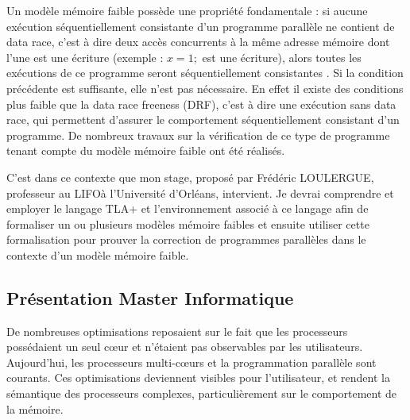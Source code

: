 \documentclass[12pt,a4paper]{article}
\begin{document}
Un modèle mémoire faible possède une propriété fondamentale : si aucune exécution séquentiellement consistante d'un programme parallèle ne contient de data race, c'est à dire deux accès concurrents à la même adresse mémoire dont l'une est une écriture (exemple : $x = 1;$ est une écriture), alors toutes les exécutions de ce programme seront séquentiellement consistantes \cite{Saraswat:2007:TMM:1229428.1229469}.
Si la condition précédente est suffisante, elle n'est pas nécessaire. En effet il existe des conditions plus faible que la data race freeness (DRF), c'est à dire une exécution sans data race, qui permettent d'assurer le comportement séquentiellement consistant d'un programme. De nombreux travaux sur la vérification de ce type de programme tenant compte du modèle mémoire faible ont été réalisés.

C'est dans ce contexte que mon stage, proposé par Frédéric LOULERGUE, professeur au LIFO\footnotemark[1] à l'Université d'Orléans, intervient. Je devrai comprendre et employer le langage TLA+ \cite{Lamport:2002:SST:579617} et l'environnement associé à ce langage afin de formaliser un ou plusieurs modèles mémoire faibles et ensuite utiliser cette formalisation pour prouver la correction de programmes parallèles dans le contexte d'un modèle mémoire faible. 
  
\subsection{Présentation Master Informatique}

De nombreuses optimisations reposaient sur le fait que les processeurs possédaient un seul cœur et n'étaient pas observables par les utilisateurs.
Aujourd'hui, les processeurs multi-cœurs et la programmation parallèle sont courants. Ces optimisations deviennent visibles pour l'utilisateur, et rendent la sémantique des processeurs complexes, particulièrement sur le comportement de la mémoire.
\end{document}
